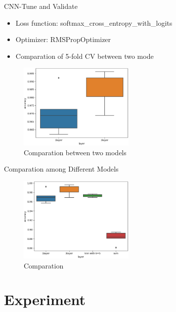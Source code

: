 \documentclass[
 size=12pt,
 paper=smartboard, %
 mode=present, %
 display=slides, %
style=tuliplab,
pauseslide,
fleqn,leqno]{powerdot}
\begin{document}
\begin{slide}{CNN-Tune and Validate}
  \begin{itemize}
    \item Loss function: softmax_cross_entropy_with_logits
    \item Optimizer: RMSPropOptimizer
    \item Comparation of 5-fold CV between two mode
  \end{itemize}
  \begin{figure}[h]
    \centering
    \includegraphics[width=0.5\textwidth]{figures/compare-layers.eps}
    \caption{Comparation between two models}
    \label{fig:comparation-two-models}
  \end{figure}  
\end{slide}

\begin{slide}{Comparation among Different Models}
  \begin{figure}[h]
    \centering
    \includegraphics[width=0.5\textwidth]{figures/comparation.eps}
    \caption{Comparation}
    \label{fig:comparation}
  \end{figure}  
\end{slide}

\section{Experiment}
\end{document}
